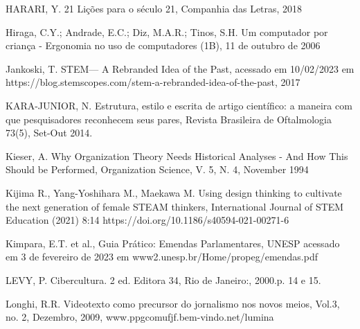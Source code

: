 \begin{flushleft}
[HARARI, 2018]  HARARI, Y. 21 Lições para o século 21, Companhia das Letras, 2018
\end{flushleft}


\begin{flushleft}
[HIRAGA et al., 2006] Hiraga, C.Y.; Andrade, E.C.; Diz, M.A.R.; Tinos, S.H. Um computador por criança - Ergonomia no uso de computadores (1B), 11 de outubro de 2006
\end{flushleft}


\begin{flushleft}
[JANKOSKI, 2017] Jankoski, T. STEM— A Rebranded Idea of the Past, acessado em 10/02/2023 em https://blog.stemscopes.com/stem-a-rebranded-idea-of-the-past, 2017
\end{flushleft}


\begin{flushleft}
 KARA-JUNIOR, N. Estrutura, estilo e escrita de artigo científico: a maneira com que pesquisadores reconhecem seus pares, Revista Brasileira de Oftalmologia 73(5), Set-Out 2014.
\end{flushleft}


\begin{flushleft}
[KIESER, 1994] Kieser, A. Why Organization Theory Needs Historical Analyses - And How This Should be Performed, Organization Science, V. 5, N. 4, November 1994
\end{flushleft}


\begin{flushleft}
[KIJIMA et al., 2021] Kijima R., Yang-Yoshihara M., Maekawa M. Using design thinking to cultivate the next generation of female STEAM thinkers, International Journal of STEM Education (2021) 8:14 https://doi.org/10.1186/s40594-021-00271-6
\end{flushleft}


\begin{flushleft}
[KIMPARA et al., 2023] Kimpara, E.T. et al., Guia Prático: Emendas Parlamentares, UNESP acessado em 3 de fevereiro de 2023 em www2.unesp.br/Home/propeg/emendas.pdf
\end{flushleft}


\begin{flushleft}
[LEVY, 2000] LEVY, P. Cibercultura. 2 ed. Editora 34,  Rio de Janeiro:, 2000.p. 14 e 15.
\end{flushleft}


\begin{flushleft}
[LONGHI, 2009] Longhi, R.R. Videotexto como precursor do jornalismo nos novos meios, Vol.3, no. 2, Dezembro, 2009, www.ppgcomufjf.bem-vindo.net/lumina
\end{flushleft}


